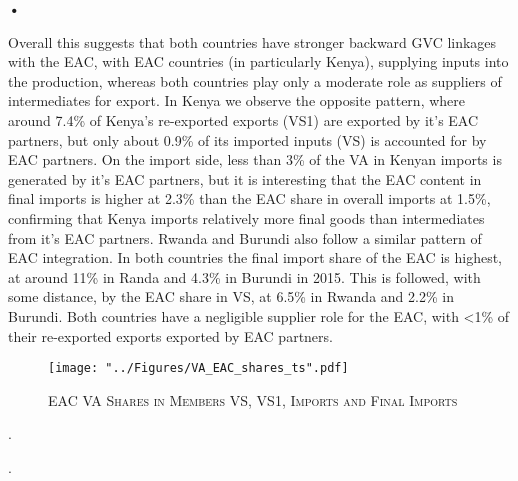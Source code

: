 \textbf{\textbf{•}}\documentclass[a4paper]{article}
\begin{document}
Overall this suggests that both countries have stronger backward GVC linkages with the EAC, with EAC countries (in particularly Kenya), supplying inputs into the production, whereas both countries play only a moderate role as suppliers of intermediates for export. In Kenya we observe the opposite pattern, where around 7.4\% of Kenya's re-exported exports (VS1) are exported by it's EAC partners, but only about 0.9\% of its imported inputs (VS) is accounted for by EAC partners. On the import side, less than 3\% of the VA in Kenyan imports is generated by it's EAC partners, but it is interesting that the EAC content in final imports is higher at 2.3\% than the EAC share in overall imports at 1.5\%, confirming that Kenya imports relatively more final goods than intermediates from it's EAC partners. Rwanda and Burundi also follow a similar pattern of EAC integration. In both countries the final import share of the EAC is highest, at around 11\% in Randa and 4.3\% in Burundi in 2015. This is followed, with some distance, by the EAC share in VS, at 6.5\% in Rwanda and 2.2\% in Burundi. Both countries have a negligible supplier role for the EAC, with <1\% of their re-exported exports exported by EAC partners. 



\begin{figure}[h!]
\centering
\caption{\label{fig:VAEACshares}\textsc{EAC VA Shares in Members VS, VS1, Imports and Final Imports}}
\texttt{[image: "../Figures/VA\_EAC\_shares\_ts".pdf]} %
\end{figure}
\FloatBarrier



.


.
\end{document}
